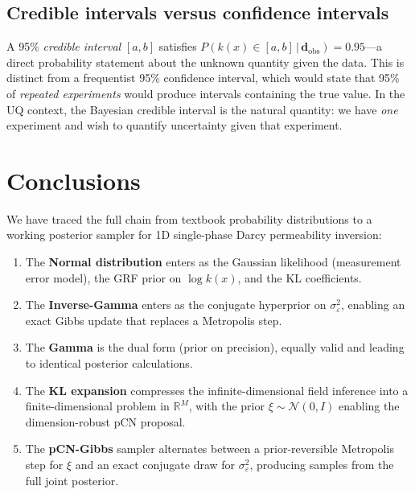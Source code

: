 \documentclass[11pt, a4paper]{article}
\newcommand{\R}{\mathbb{R}}
\newcommand{\N}{\mathcal{N}}
\theoremstyle{definition}
\begin{document}
\subsection{Credible intervals versus confidence intervals}

A 95\% \emph{credible interval} $[a,b]$ satisfies
$P(k(x)\in[a,b]\,|\,\mathbf{d}_{\mathrm{obs}})=0.95$---a direct
probability statement about the unknown quantity given the data.
This is distinct from a frequentist 95\% confidence interval, which
would state that 95\% of \emph{repeated experiments} would produce
intervals containing the true value.  In the UQ context, the Bayesian
credible interval is the natural quantity: we have \emph{one}
experiment and wish to quantify uncertainty given that experiment.

\section{Conclusions}

We have traced the full chain from textbook probability distributions to
a working posterior sampler for 1D single-phase Darcy permeability
inversion:

\begin{enumerate}
  \item The \textbf{Normal distribution} enters as the Gaussian likelihood
    (measurement error model), the GRF prior on $\log k(x)$, and the
    KL coefficients.

  \item The \textbf{Inverse-Gamma} enters as the conjugate hyperprior
    on $\sigma_\varepsilon^2$, enabling an exact Gibbs update that
    replaces a Metropolis step.

  \item The \textbf{Gamma} is the dual form (prior on precision),
    equally valid and leading to identical posterior calculations.

  \item The \textbf{KL expansion} compresses the infinite-dimensional
    field inference into a finite-dimensional problem in $\R^M$, with
    the prior $\xi\sim\N(0,I)$ enabling the dimension-robust pCN proposal.

  \item The \textbf{pCN-Gibbs} sampler alternates between a
    prior-reversible Metropolis step for $\xi$ and an exact conjugate
    draw for $\sigma_\varepsilon^2$, producing samples from the full
    joint posterior.
\end{enumerate}
\end{document}
